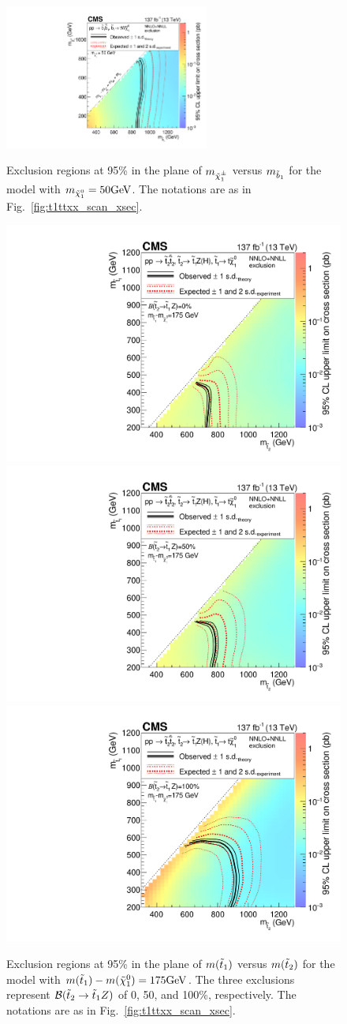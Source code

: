 \begin{figure}[!hbtp]
\centering
\includegraphics[width=0.60\textwidth]{figs/ssp/scan_t6ttww.pdf}\\
\caption{ Exclusion regions at 95\% \CL in the plane of $m_{\tilde{\chi}_1^{\pm}}$ versus $m_{\tilde{b}_1}$ for the \TsttWW model with $m_{\tilde{\chi}_1^0}=50\text{GeV}$.
    The notations are as in Fig.~\ref{fig:t1ttxx_scan_xsec}. }
\label{fig:t6ttww_scan_xsec}
\end{figure}

\begin{figure}[!hbtp]
\centering
\includegraphics[width=.45\textwidth]{figs/ssp/scan_t6tthzbrh.pdf}
\includegraphics[width=.45\textwidth]{figs/ssp/scan_t6tthzbrb.pdf} \\
\includegraphics[width=.45\textwidth]{figs/ssp/scan_t6tthzbrz.pdf}
\\
\caption{
Exclusion regions at 95\% \CL in the plane of $m(\tilde{t}_1)$ versus
$m(\tilde{t}_2)$ for the \TsttHZ model with $m(\tilde{t}_1)-m(\tilde{\chi}_1^0)=175\text{GeV}$.
The three exclusions represent $\mathcal{B}(\tilde{t}_2\to\tilde{t}_1Z)$ of
0, 50, and 100\%, respectively.
The notations are as in Fig.~\ref{fig:t1ttxx_scan_xsec}.
}
\label{fig:t6tthz_scan_xsec}
\end{figure}

